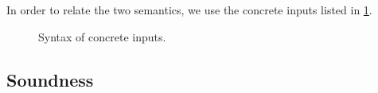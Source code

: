 %
%
%
%
%

In order to relate the two semantics, we use the concrete inputs listed in \cref{fig:inputsConcrete}.

\begin{figure}[h]
  \caption{Syntax of concrete inputs.}
  \label{fig:inputsConcrete}
\end{figure}


\subsection{Soundness}
\label{sec:soundess}






